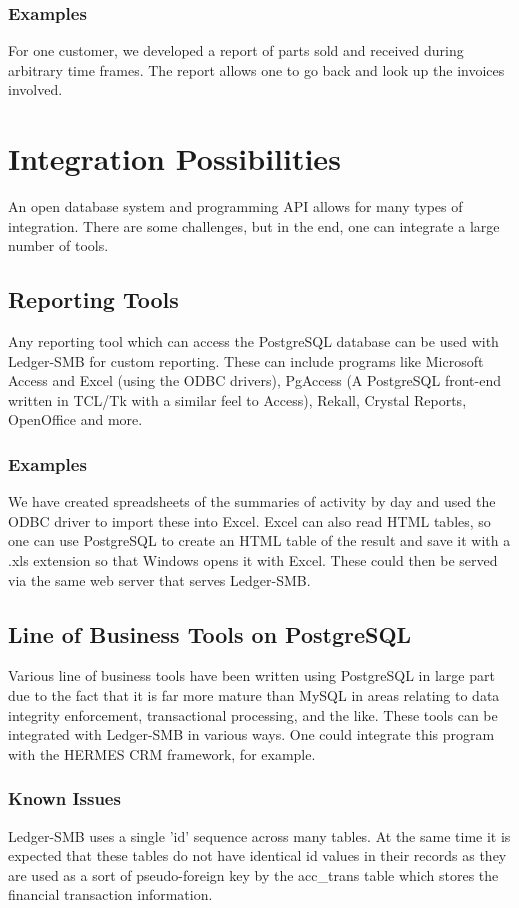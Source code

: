 \documentclass{article}
\begin{document}
\subsubsection{Examples}
For one customer, we developed a report of parts sold and received during
arbitrary time frames.  The report allows one to go back and look up the invoices
involved.

\section{Integration Possibilities}
An open database system and programming API allows for many types of
integration.  There are some challenges, but in the end, one can integrate a
large number of tools.

\subsection{Reporting Tools}
Any reporting tool which can access the PostgreSQL database can be used with
Ledger-SMB for custom reporting.  These can include programs like Microsoft
Access and Excel (using the ODBC drivers), PgAccess (A PostgreSQL front-end
written in TCL/Tk with a similar feel to Access), Rekall, Crystal Reports,
OpenOffice and more.

\subsubsection{Examples}
We have created spreadsheets of the summaries of activity by day and used the
ODBC driver to import these into Excel.  Excel can also read HTML tables, so one
can use PostgreSQL to create an HTML table of the result and save it with a .xls
extension so that Windows opens it with Excel.  These could then be served via
the same web server that serves Ledger-SMB.

\subsection{Line of Business Tools on PostgreSQL}
Various line of business tools have been written using PostgreSQL in large part
due to the fact that it is far more mature than MySQL in areas relating to data
integrity enforcement, transactional processing, and the like.  These tools can
be integrated with Ledger-SMB in various ways.  One could integrate this program
with the HERMES CRM framework, for example.

\subsubsection{Known Issues}
Ledger-SMB uses a single 'id' sequence across many tables.  At the same time it
is expected that these tables do not have identical id values in their records
as they are used as a sort of pseudo-foreign key by the acc\_trans table which
stores the financial transaction information.
\end{document}
